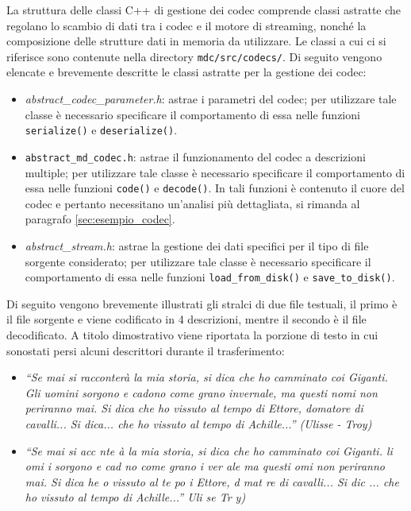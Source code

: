 La struttura delle classi C++ di gestione dei codec comprende classi astratte
che regolano lo scambio di dati tra i codec e il motore di streaming, nonché la
composizione delle strutture dati in memoria da utilizzare. Le classi a cui ci
si riferisce sono contenute nella directory \texttt{mdc/src/codecs/}. Di seguito vengono elencate e brevemente descritte le classi astratte per la
gestione dei codec:
\begin{itemize}
 \item \textit{abstract\_codec\_parameter.h}: astrae i parametri del codec; per
 utilizzare tale classe è necessario specificare il comportamento di essa nelle
 funzioni \texttt{serialize()} e \texttt{deserialize()}.
 \item \texttt{abstract\_md\_codec.h}: astrae il funzionamento del codec a
 descrizioni multiple; per utilizzare tale classe è necessario specificare il
 comportamento di essa nelle funzioni \texttt{code()} e \texttt{decode()}. In
 tali funzioni è contenuto il cuore del codec e pertanto necessitano un'analisi
 più dettagliata, si rimanda al paragrafo \ref{sec:esempio_codec}.
 \item \textit{abstract\_stream.h}: astrae la gestione dei dati specifici per il
 tipo di file sorgente considerato; per utilizzare tale classe è necessario
 specificare il comportamento di essa nelle funzioni \texttt{load\_from\_disk()}
 e \texttt{save\_to\_disk()}.
\end{itemize}

Di seguito vengono brevemente illustrati gli stralci di due file
testuali, il primo è il file sorgente e viene codificato in 4 descrizioni,
mentre il secondo è il file decodificato. A titolo dimostrativo viene riportata
la porzione di testo in cui sonostati persi alcuni descrittori durante il
trasferimento:

\begin{itemize}
  \item \emph{``Se mai si racconterà la mia storia, si dica che ho camminato
  coi Giganti. Gli uomini sorgono e cadono come grano invernale, ma questi nomi non periranno mai. Si dica che ho vissuto al tempo di Ettore, domatore di cavalli... Si dica... che ho vissuto al tempo di Achille...'' (Ulisse - Troy)}
  \item \emph{``Se mai si  acc nte à la mia storia, si dica che ho camminato
  coi Giganti.  li  omi i sorgono e cad no come grano i ver ale  ma questi  omi
  non periranno mai. Si dica  he  o vissuto al te po  i Ettore, d mat re di
  cavalli... Si dic ... che ho vissuto al tempo di Achille...''  Uli se   Tr
  y)}
\end{itemize}

